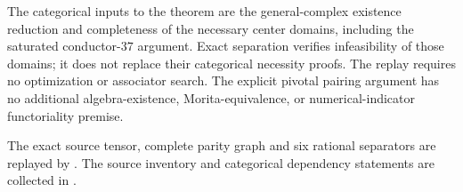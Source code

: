 The categorical inputs to the theorem are the general-complex existence
reduction and completeness of the necessary center domains, including
the saturated conductor-$37$ argument.  Exact separation verifies
infeasibility of those domains; it does not replace their categorical
necessity proofs.  The replay requires no optimization or associator
search.  The explicit pivotal pairing argument has no additional
algebra-existence, Morita-equivalence, or numerical-indicator
functoriality premise.


The exact source tensor, complete parity graph and six rational separators
are replayed by .
The source inventory and categorical dependency statements are collected in
.
